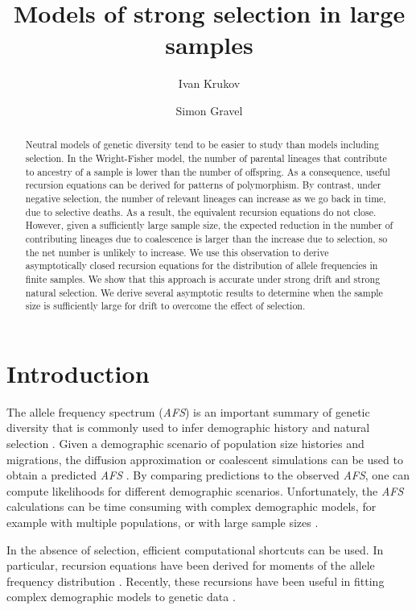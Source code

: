 \documentclass[review]{elsarticle}
\begin{document}
\begin{frontmatter}
  \title{Models of strong selection in large samples}

  \author{Ivan Krukov}
  \author{Simon Gravel}

  \begin{abstract}
    Neutral models of genetic diversity tend to be easier to study than models including selection.
    In the Wright-Fisher model, the number of parental lineages that contribute to ancestry of a
    sample is lower than the number of offspring. As a consequence, useful recursion equations can
    be derived for patterns of polymorphism. By contrast, under negative selection, the number of
    relevant lineages can increase as we go back in time, due to selective deaths. As a result, the
    equivalent recursion equations do not close. However, given a sufficiently large sample size,
    the expected reduction in the number of contributing lineages due to coalescence is larger than
    the increase due to selection, so the net number is unlikely to increase. We use this
    observation to derive asymptotically closed recursion equations for the distribution of allele
    frequencies in finite samples. We show that this approach is accurate under strong drift and
    strong natural selection. We derive several asymptotic results to determine when the sample size
    is sufficiently large for drift to overcome the effect of selection.
  \end{abstract}

\end{frontmatter}

\section{Introduction}
\label{sec:introduciton}

The allele frequency spectrum (\textit{AFS}) is an important summary of genetic diversity that is
commonly used to infer demographic history and natural selection \citep{}. Given a demographic
scenario of population size histories and migrations, the diffusion approximation or coalescent
simulations can be used to obtain a predicted \textit{AFS} \citep{}. By comparing predictions to the
observed \textit{AFS}, one can compute likelihoods for different demographic scenarios.
Unfortunately, the \textit{AFS} calculations can be time consuming with complex demographic models,
for example with multiple populations, or with large sample sizes \citep{}.

In the absence of selection, efficient computational shortcuts can be used. In particular, recursion
equations have been derived for moments of the allele frequency distribution
\citep{KimuraCrow1964,Ewens1972,JouganousEtAl2017}. Recently, these recursions have been useful in
fitting complex demographic models to genetic data \citep{JouganousEtAl2017,KammEtAl2017}.
 
\end{document}
